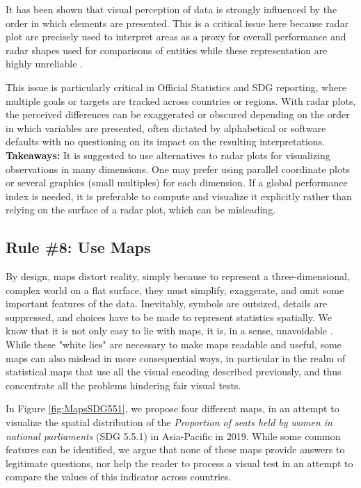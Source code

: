\documentclass[11pt,twoside,a4paper]{article}
\begin{document}
It has been shown \citep{Bertin1983English} that visual perception of data is strongly influenced by the order in which elements are presented. This is a critical issue here because  radar plot  are precisely used to interpret areas as a proxy for overall performance and radar shapes used for comparisons of entities while these representation are highly unreliable \citep{Bontemps2017, holtz2020radar}. 

This issue is particularly critical in Official Statistics and SDG reporting, where multiple goals or targets are tracked across countries or regions. With radar plots, the perceived differences can be exaggerated or obscured depending on the order in which variables are presented, often dictated by alphabetical or software defaults with no questioning on its impact on the resulting interpretations.\\

\noindent \textbf{ Takeaways:} It is suggested to use alternatives to radar plots for visualizing observations in many dimensions. One may prefer using parallel coordinate plots \citep{holtzPCP} or several graphics (small multiples) for each dimension. If a global performance index is needed, it is preferable to compute and visualize it explicitly rather than relying on the surface of a radar plot, which can be misleading.

\subsection*{Rule \#8: Use Maps}
By design, maps distort reality, simply because to represent a three-dimensional, complex world on a flat surface, they must simplify, exaggerate, and omit some important features of the data. Inevitably, symbols are outsized, details are suppressed, and choices have to be made to represent statistics spatially. We know that it is not only easy to lie with maps, it is, in a sense, unavoidable \citep{Monmonier1991}. While these "white lies" are necessary to make maps readable and useful, some maps can also mislead in more consequential ways, in particular in the realm of statistical maps that use all the visual encoding described previously, and thus concentrate all the problems hindering fair visual tests.

In Figure \ref{fig:MapsSDG551}, we propose four different maps, in an attempt to visualize the spatial distribution of the \textit{Proportion of seats held by women in  national parliaments} (SDG 5.5.1) in Asia-Pacific in 2019. While some common features can be identified, we argue that none of these maps provide answers to legitimate questions, nor help the reader to process a visual test in an attempt to compare the values of this indicator across countries.   
\end{document}

